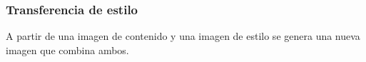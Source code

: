 \documentclass[10pt,center]{beamer}
\begin{document}
\begin{frame}
  \frametitle{Transferencia de estilo}
  A partir de una imagen de contenido y una imagen de estilo se genera una nueva imagen que combina ambos.
  \begin{figure}[h]
    \begin{center}
       \vspace{1.0cm}
       \vspace{1.0cm}

\end{center}
\end{figure}
\end{frame}
\end{document}
